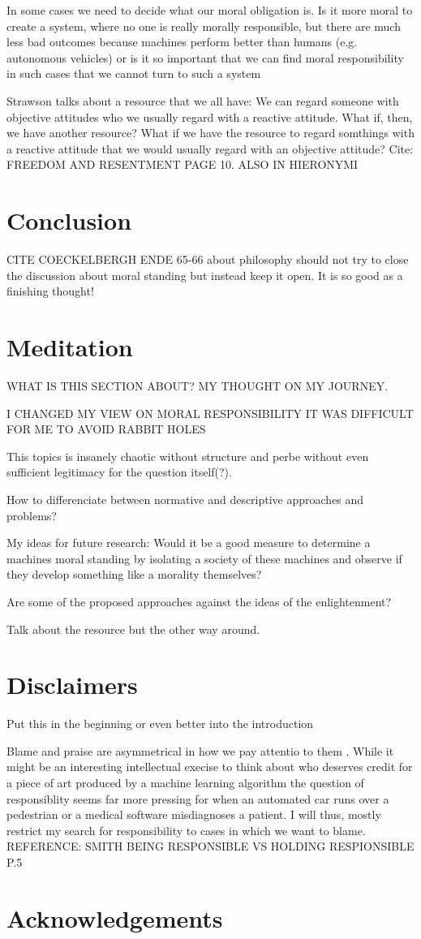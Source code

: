 \documentclass{article}
\begin{document}
In some cases we need to decide what our moral obligation is. Is it more moral
to create a system, where no one is really morally responsible, but there are
much less bad outcomes because machines perform better than humans (e.g.
autonomous vehicles) or is it so important that we can find moral responsibility
in such cases that we cannot turn to such a system

Strawson talks about a resource that we all have: We can regard someone with
objective attitudes who we usually regard with a reactive attitude. What if,
then, we have another resource? What if we have the resource to regard somthings
with a reactive attitude that we would usually regard with an objective
attitude? Cite: FREEDOM AND RESENTMENT PAGE 10. ALSO IN HIERONYMI
\section{Conclusion}

CITE COECKELBERGH ENDE 65-66 about philosophy should not try to close the
discussion about moral standing but instead keep it open. It is so good as a
finishing thought!
\section{Meditation}
WHAT IS THIS SECTION ABOUT?
MY THOUGHT ON MY JOURNEY.

I CHANGED MY VIEW ON MORAL RESPONSIBILITY
IT WAS DIFFICULT FOR ME TO AVOID RABBIT HOLES

This topics is insanely chaotic without structure and perbe without even
sufficient legitimacy for the question itself(?).

How to differenciate between normative and descriptive approaches and problems?

My ideas for future research: Would it be a good measure to determine a machines
moral standing by isolating a society of these machines and observe if they
develop something like a morality themselves?

Are some of the proposed approaches against the ideas of the enlightenment?

Talk about the resource but the other way around.
\section{Disclaimers}
Put this in the beginning or even better into the introduction

Blame and praise are asymmetrical in how we pay attentio to them . While it
might be an interesting intellectual execise to think about who deserves credit
for a piece of art produced by a machine learning algorithm the question of
responsiblity seems far more pressing for when an automated car runs over a
pedestrian or a medical software misdiagnoses a patient. I will thus, mostly
restrict my search for responsibility to cases in which we want to blame.
REFERENCE: SMITH BEING RESPONSIBLE VS HOLDING RESPIONSIBLE P.5
\section{Acknowledgements}
\clearpage

\printglossary[type=\acronymtype]
\printglossary
\printbibliography
\end{document}
